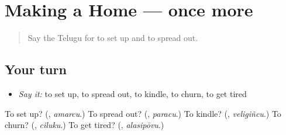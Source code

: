 \section[(dialogue)]{Making a Home — once more}

\label{lesson:TE-R549-review-final-549}



\begin{quote}
Say the Telugu for to set up and to spread out.
\end{quote}

\subsection*{Your turn}
\begin{itemize}
\raggedright
  \item \emph{Say it:} to set up, to spread out, to kindle, to churn, to get tired
\end{itemize}

\begin{tcolorbox}[breakable,colback=teal!4,colframe=teal!35!black,title={Before you move on}]
To set up? (\textbf{}, \emph{amarcu}.) To spread out? (\textbf{}, \emph{paracu}.) To kindle? (\textbf{}, \emph{veligiñcu}.) To churn? (\textbf{}, \emph{ciluku}.) To get tired? (\textbf{}, \emph{alasipōvu}.)
\end{tcolorbox}
